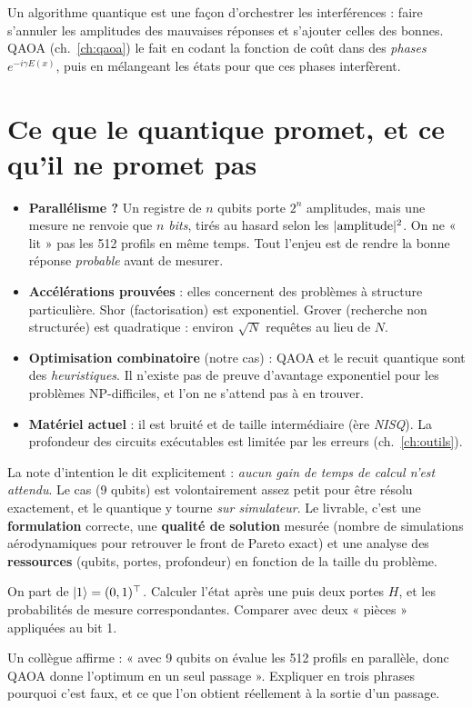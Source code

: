 \begin{resultat}
Un algorithme quantique est une façon d'orchestrer les interférences : faire s'annuler les amplitudes des mauvaises réponses et s'ajouter celles des bonnes. QAOA (ch.~\ref{ch:qaoa}) le fait en codant la fonction de coût dans des \emph{phases} $e^{-i\gamma E(x)}$, puis en mélangeant les états pour que ces phases interfèrent.
\end{resultat}

\section{Ce que le quantique promet, et ce qu'il ne promet pas}
\begin{itemize}
\item \textbf{Parallélisme ?} Un registre de $n$ qubits porte $2^n$ amplitudes, mais une mesure ne renvoie que \emph{$n$ bits}, tirés au hasard selon les $|{\rm amplitude}|^2$. On ne « lit » pas les 512 profils en même temps. Tout l'enjeu est de rendre la bonne réponse \emph{probable} avant de mesurer.
\item \textbf{Accélérations prouvées} : elles concernent des problèmes à structure particulière. Shor (factorisation) est exponentiel. Grover (recherche non structurée) est quadratique : environ $\sqrt N$ requêtes au lieu de $N$.
\item \textbf{Optimisation combinatoire} (notre cas) : QAOA et le recuit quantique sont des \emph{heuristiques}. Il n'existe pas de preuve d'avantage exponentiel pour les problèmes NP-difficiles, et l'on ne s'attend pas à en trouver.
\item \textbf{Matériel actuel} : il est bruité et de taille intermédiaire (ère \emph{NISQ}). La profondeur des circuits exécutables est limitée par les erreurs (ch.~\ref{ch:outils}).
\end{itemize}

\begin{projet}
La note d'intention le dit explicitement : \emph{aucun gain de temps de calcul n'est attendu}. Le cas (9 qubits) est volontairement assez petit pour être résolu exactement, et le quantique y tourne \emph{sur simulateur}. Le livrable, c'est une \textbf{formulation} correcte, une \textbf{qualité de solution} mesurée (nombre de simulations aérodynamiques pour retrouver le front de Pareto exact) et une analyse des \textbf{ressources} (qubits, portes, profondeur) en fonction de la taille du problème.
\end{projet}

\exercices
\begin{exercice}[interférence]
On part de $\lvert 1\rangle=(0,1)^\top$. Calculer l'état après une puis deux portes $H$, et les probabilités de mesure correspondantes. Comparer avec deux « pièces » appliquées au bit 1.
\end{exercice}
\begin{exercice}[parallélisme]
Un collègue affirme : « avec 9 qubits on évalue les 512 profils en parallèle, donc QAOA donne l'optimum en un seul passage ». Expliquer en trois phrases pourquoi c'est faux, et ce que l'on obtient réellement à la sortie d'un passage.
\end{exercice}
